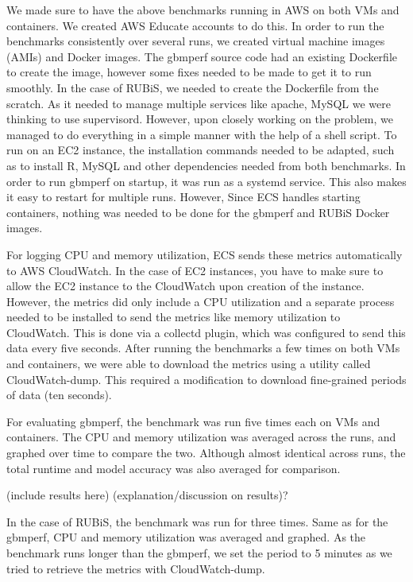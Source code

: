 \documentclass[11pt]{article}
\begin{document}
We made sure to have the above benchmarks running in AWS on both VMs and containers. We created AWS Educate accounts to do this. In order to run the benchmarks consistently over several runs, we created virtual machine images (AMIs) and Docker images. The gbmperf source code had an existing Dockerfile to create the image, however some fixes needed to be made to get it to run smoothly. In the case of RUBiS, we needed to create the Dockerfile from the scratch. As it needed to manage multiple services like apache, MySQL we were thinking to use supervisord. However, upon closely working on the problem, we managed to do everything in a simple manner with the help of a shell script. To run on an EC2 instance, the installation commands needed to be adapted, such as to install R, MySQL and other dependencies needed from both benchmarks. In order to run gbmperf on startup, it was run as a systemd service. This also makes it easy to restart for multiple runs. However, Since ECS handles starting containers, nothing was needed to be done for the gbmperf and RUBiS Docker images.

For logging CPU and memory utilization, ECS sends these metrics automatically to AWS CloudWatch. In the case of EC2 instances, you have to make sure to allow the EC2 instance to the CloudWatch upon creation of the instance. However, the metrics did only include a CPU utilization and a separate process needed to be installed to send the metrics like memory utilization to CloudWatch. This is done via a collectd plugin, which was configured to send this data every five seconds. After running the benchmarks a few times on both VMs and containers, we were able to download the metrics using a utility called CloudWatch-dump. This required a modification to download fine-grained periods of data (ten seconds).

For evaluating gbmperf, the benchmark was run five times each on VMs and containers. The CPU and memory utilization was averaged across the runs, and graphed over time to compare the two. Although almost identical across runs, the total runtime and model accuracy was also averaged for comparison.

(include results here)
(explanation/discussion on results)?

In the case of RUBiS, the benchmark was run for three times. Same as for the gbmperf, CPU and memory utilization was averaged and graphed. As the benchmark runs longer than the gbmperf, we set the period to 5 minutes as we tried to retrieve the metrics with CloudWatch-dump. 
\end{document}
